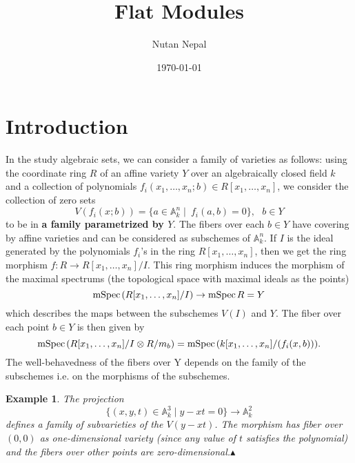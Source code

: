 \documentclass[12pt]{article}
\title{Flat Modules}
\author{Nutan Nepal}
\date{\today}
\theoremstyle{mytheoremstyle}
\newtheorem{example}{Example}
\newcommand{\bA}{\mathbb{A}}
\newcommand{\mspec}{\text{mSpec\hspace*{.5mm}}}
\begin{document}
\maketitle

\makebox[\linewidth]{\rule{200mm}{1pt}}
\section{Introduction}
\hspace*{8mm}In the study algebraic sets, we can consider a family of varieties as
follows: using the coordinate ring $R$ of an
affine variety $Y$ over an algebraically closed field $k$ and a collection
of polynomials $f_i(x_1,\ldots,x_n; b)\in R[x_1,\ldots,x_n]$, we consider
the collection of zero sets
$$V(f_i(x;b))=\{a\in \mathbb{A}^n_k\mid \ f_i(a,b)=0\},\ \ \ b\in Y$$ to be
in \textbf{a family parametrized by $Y$}. The fibers over each $b\in Y$
have covering by affine varieties and can be considered
as subschemes of $\bA^n_k$.
If $I$ is the ideal generated by the polynomials $f_i$'s
in the ring $R[x_1,\ldots,x_n]$,
then we get the ring morphism $f\colon R\to R[x_1,\ldots,x_n]/I$.
This ring morphism induces the morphism of the maximal spectrums (the topological
space with maximal ideals as the points)
$$\mspec (R[x_1,\ldots,x_n]/I) \to \mspec R = Y$$
which describes the maps between the subschemes $V(I)$ and $Y$.
The fiber over each point $b\in Y$ is then given by
$$\mspec (R[x_1,\ldots,x_n]/I\otimes R/m_b)=\mspec (k[x_1,\ldots,x_n]
    /(f_i(x,b))).$$
The well-behavedness of the fibers over Y depends on the family of
the subschemes i.e. on the morphisms of the subschemes.
\begin{example}
    The projection
    $$\{(x,y,t)\in \bA^3_k\mid y-xt=0\}\to \bA^2_k$$
    defines a family of subvarieties of the $V(y-xt)$.
    The morphism has fiber over $(0,0)$ as one-dimensional variety
    (since any value of $t$
    satisfies the polynomial) and the fibers over other points are
    zero-dimensional.$\blacktriangle$
\end{example}
\end{document}
